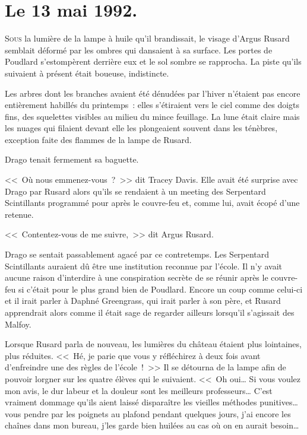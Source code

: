
\section{Le 13 mai 1992.}

\lettrine{S}{ous} la lumière de la lampe à huile qu'il brandissait, le visage d'Argus Rusard semblait déformé par les ombres qui dansaient à sa surface. Les portes de Poudlard s'estompèrent derrière eux et le sol sombre se rapprocha. La piste qu'ils suivaient à présent était boueuse, indistincte.

Les arbres dont les branches avaient été dénudées par l'hiver n'étaient pas encore entièrement habillés du printemps~: elles s'étiraient vers le ciel comme des doigts fins, des squelettes visibles au milieu du mince feuillage. La lune était claire mais les nuages qui filaient devant elle les plongeaient souvent dans les ténèbres, exception faite des flammes de la lampe de Rusard.

Drago tenait fermement sa baguette.

<<~Où nous emmenez-vous~?~>> dit Tracey Davis. Elle avait été surprise avec Drago par Rusard alors qu'ils se rendaient à un meeting des Serpentard Scintillants programmé pour après le couvre-feu et, comme lui, avait écopé d'une retenue.

<<~Contentez-vous de me suivre,~>> dit Argus Rusard.

Drago se sentait passablement agacé par ce contretemps. Les Serpentard Scintillants auraient dû être une institution reconnue par l'école. Il n'y avait aucune raison d'interdire à une conspiration secrète de se réunir après le couvre-feu si c'était pour le plus grand bien de Poudlard. Encore un coup comme celui-ci et il irait parler à Daphné Greengrass, qui irait parler à son père, et Rusard apprendrait alors comme il était sage de regarder ailleurs lorsqu'il s'agissait des Malfoy.

Lorsque Rusard parla de nouveau, les lumières du château étaient plus lointaines, plus réduites. <<~Hé, je parie que vous y réfléchirez à deux fois avant d'enfreindre une des règles de l'école~!~>> Il se détourna de la lampe afin de pouvoir lorgner sur les quatre élèves qui le suivaient. <<~Oh oui… Si vous voulez mon avis, le dur labeur et la douleur sont les meilleurs professeurs… C'est vraiment dommage qu'ils aient laissé disparaître les vieilles méthodes punitives… vous pendre par les poignets au plafond pendant quelques jours, j'ai encore les chaînes dans mon bureau, j'les garde bien huilées au cas où on en aurait besoin…

